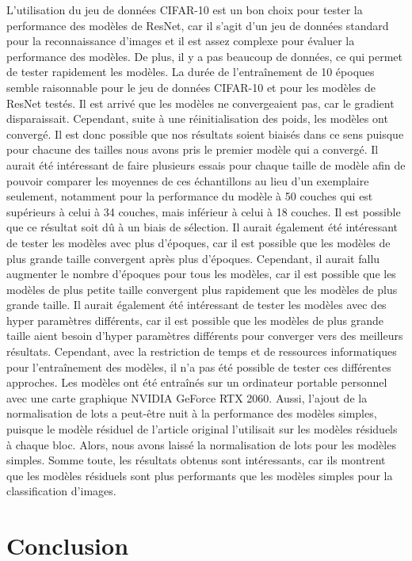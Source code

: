 \documentclass{article}
\begin{document}
L'utilisation du jeu de données CIFAR-10 est un bon choix pour tester la performance des modèles de ResNet,
car il s'agit d'un jeu de données standard pour la reconnaissance d'images et il est assez complexe pour évaluer
la performance des modèles. De plus, il y a pas beaucoup de données, ce qui permet de tester rapidement les modèles.
La durée de l'entraînement de 10 époques semble raisonnable pour le jeu de données CIFAR-10 et pour les
modèles de ResNet testés. Il est arrivé que les modèles ne convergeaient pas, car le gradient disparaissait. Cependant, suite
à une réinitialisation des poids, les modèles ont convergé. Il est donc possible que nos résultats soient biaisés dans ce sens puisque
pour chacune des tailles nous avons pris le premier modèle qui a convergé. Il aurait été intéressant de faire plusieurs essais pour
chaque taille de modèle afin de pouvoir comparer les moyennes de ces échantillons au lieu d'un exemplaire seulement, notamment pour
la performance du modèle à 50 couches qui est supérieurs à celui à 34 couches, mais inférieur à celui à 18 couches. Il est possible
que ce résultat soit dû à un biais de sélection. Il aurait également été intéressant de tester les modèles avec plus d'époques, car
il est possible que les modèles de plus grande taille convergent après plus d'époques. Cependant, il aurait fallu augmenter le nombre
d'époques pour tous les modèles, car il est possible que les modèles de plus petite taille convergent plus rapidement que les modèles
de plus grande taille. Il aurait également été intéressant de tester les modèles avec des hyper paramètres différents, car il est possible
que les modèles de plus grande taille aient besoin d'hyper paramètres différents pour converger vers des meilleurs résultats. Cependant,
avec la restriction de temps et de ressources informatiques pour l'entraînement des modèles, il n'a pas été possible de tester ces
différentes approches. Les modèles ont été entraînés sur un ordinateur portable personnel avec une carte graphique NVIDIA GeForce RTX 2060.
Aussi, l'ajout de la normalisation de lots a peut-être nuit à la performance des modèles simples, puisque le modèle résiduel de l'article original
l'utilisait sur les modèles résiduels à chaque bloc. Alors, nous avons laissé la normalisation de lots pour les modèles simples.
Somme toute, les résultats obtenus sont intéressants, car ils montrent que les modèles résiduels sont plus performants que les modèles simples
pour la classification d'images.

\section{Conclusion}
\end{document}
